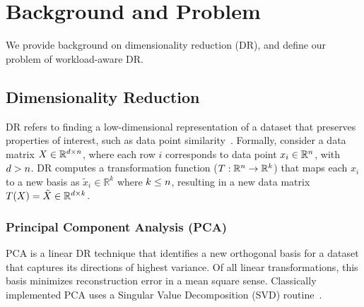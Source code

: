 \section{Background and Problem}
\label{sec:background}

We  provide background on dimensionality reduction (DR), and define our problem of workload-aware DR. 

\subsection{Dimensionality Reduction}
\label{sec:defs}

DR refers to finding a low-dimensional representation of a dataset that preserves properties of interest, such as data point similarity~\cite{dr-survey1,dr-survey2}. Formally, consider a data matrix $X \in \mathbb{R}^{{\color{black}d} \times {\color{black}n}}$, where each row $i$ corresponds to data point $x_i \in \mathbb{R}^{\color{black}n}$, with ${\color{black}d} > {\color{black}n}$.  
DR computes a transformation function ($T: \mathbb{R}^{\color{black}n} \rightarrow \mathbb{R}^k$) that maps each $x_i$ to a new basis as $\tilde{x}_i \in \mathbb{R}^k$ where $k \leq {\color{black}n}$, resulting in a new data matrix $T(X) = \tilde{X} \in \mathbb{R}^{{\color{black}d} \times k}$.

\subsubsection*{Principal Component Analysis (PCA)}
\label{sec:pca}
PCA is a linear DR technique that identifies a new orthogonal basis for a dataset that captures its directions of highest variance.
Of all linear transformations, this basis minimizes reconstruction error in a mean square sense. 
Classically implemented PCA uses a Singular Value Decomposition (SVD) routine~\cite{trefethen}.

